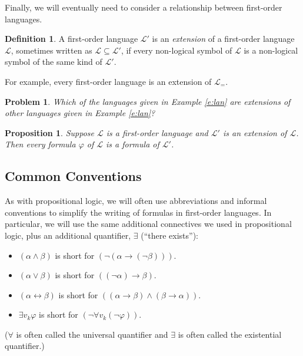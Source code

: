\documentclass[12pt]{amsbook}
\newcommand{\fromto}{\leftrightarrow}
\theoremstyle{plain}
\newtheorem{prop}[thm]{Proposition}
\newtheorem{prob}[thm]{Problem}
\theoremstyle{definition}
\newtheorem{defn}{Definition}[chapter]
\theoremstyle{remark}
\begin{document}
Finally,  we will eventually need to consider a relationship between first-order languages.

\begin{defn} \label{d:exlan}  
A first-order language $\mathcal{L}'$ is an {\em extension\/} of a first-order language $\mathcal{L}$,  sometimes written as $\mathcal{L} \subseteq \mathcal{L}'$,  if every non-logical symbol of $\mathcal{L}$ is a non-logical symbol of the same kind of $\mathcal{L}'$.
\end{defn}

For example,  every first-order language is an extension of $\mathcal{L}_=$.

\begin{prob} \label{p:five13}
Which of the languages given in Example \ref{e:lan} are extensions of other languages given in Example \ref{e:lan}?
\end{prob}

\begin{prop} \label{p:exlan}
Suppose $\mathcal{L}$ is a first-order language and $\mathcal{L}'$ is an extension of $\mathcal{L}$.   Then every formula $\varphi$ of $\mathcal{L}$ is a formula of $\mathcal{L}'$.
\end{prop}

\subsection*{Common Conventions}

As with propositional logic,  we will often use abbreviations and informal conventions to simplify the writing of formulas in first-order languages.  In particular,  we will use the same additional connectives we used in propositional logic,  plus an additional quantifier,  $\exists$ (``there exists''):  
\begin{itemize}
\item $(\alpha \land \beta)$ is short for $(\lnot (\alpha \to (\lnot \beta)))$\index{$\land$}.
\item $(\alpha \lor \beta)$ is short for $( (\lnot \alpha) \to \beta)$\index{$\lor$}.
\item $(\alpha \fromto \beta)$ is short for $((\alpha \to \beta) \land (\beta \to \alpha))$\index{$\fromto$}.
\item $\exists v_k \varphi$ is short for $(\lnot \forall v_k (\lnot \varphi))$\index{$\exists$}.
\end{itemize}
($\forall$\index{$\forall$} is often called the universal quantifier   and $\exists$ is often called the existential quantifier.)   
\end{document}
